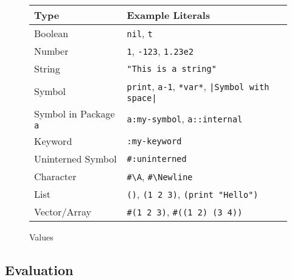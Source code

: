 \documentclass[a4paper]{amsart}
\begin{document}
\begin{figure}[tp]
  \centering
  \begin{tabular}{|l|l|}
    \hline
    Type& Example Literals\\
    \hline\hline
    Boolean & \texttt{nil}, \texttt{t}\\
    \hline
    Number & \texttt{1}, \texttt{-123}, \texttt{1.23e2}\\
    \hline
    String & \verb|"This is a string"|\\
    \hline
    Symbol & \verb|print|, \verb|a-1|, \verb|*var*|, \verb=|Symbol with space|=\\
    \hline
    Symbol in Package \texttt{a} & \verb|a:my-symbol|, \verb|a::internal|\\
    \hline
    Keyword & \verb|:my-keyword|\\
    \hline
    Uninterned Symbol & \verb|#:uninterned|\\
    \hline
    Character & \verb|#\A|, \verb|#\Newline|\\
    \hline
    List & \verb|()|, \verb|(1 2 3)|, \verb|(print "Hello")|\\
    \hline
    Vector/Array & \verb|#(1 2 3)|, \verb|#((1 2) (3 4))|\\
    \hline
  \end{tabular}
  \caption{Values}
  \label{fig:value-literals}
\end{figure}

\subsection{Evaluation}
\label{sec:evaluation}
\end{document}
